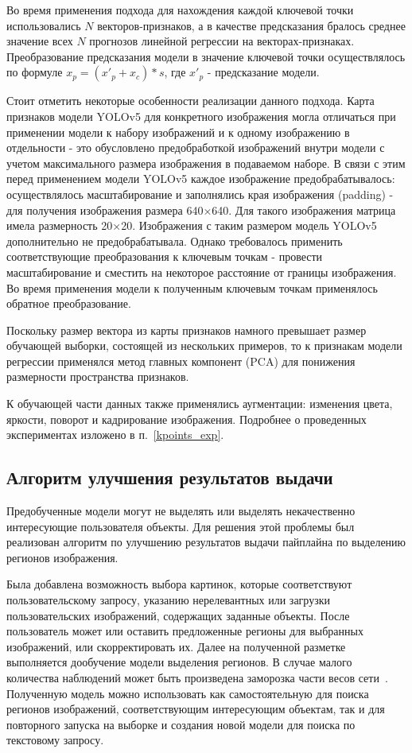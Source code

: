 \documentclass[a4paper,14pt]{article}
\begin{document}
    Во время применения подхода для нахождения каждой ключевой точки использовались $N$ векторов-признаков, а в качестве предсказания бралось среднее значение всех $N$ прогнозов линейной регрессии на векторах-признаках.
    Преобразование предсказания модели в значение ключевой точки осуществлялось по формуле $x_p = (x'_p + x_c) * s$, где $x'_p$ - предсказание модели.

    Стоит отметить некоторые особенности реализации данного подхода.
    Карта признаков модели YOLOv5 для конкретного изображения могла отличаться при применении модели к набору изображений и к одному изображению в отдельности - это обусловлено предобработкой изображений внутри модели с учетом максимального размера изображения в подаваемом наборе.
    В связи с этим перед применением модели YOLOv5 каждое изображение предобрабатывалось: осуществлялось масштабирование и заполнялись края изображения (padding) - для получения изображения размера 640×640.
    Для такого изображения матрица имела размерность 20×20.
    Изображения с таким размером модель YOLOv5 дополнительно не предобрабатывала.
    Однако требовалось применить соответствующие преобразования к ключевым точкам - провести масштабирование и сместить на некоторое расстояние от границы изображения.
    Во время применения модели к полученным ключевым точкам применялось обратное преобразование.

    Поскольку размер вектора из карты признаков намного превышает размер обучающей выборки, состоящей из нескольких примеров, то к признакам модели регрессии применялся метод главных компонент (PCA) для понижения размерности пространства признаков.

    К обучающей части данных также применялись аугментации: изменения цвета, яркости, поворот и кадрирование изображения. Подробнее о проведенных экспериментах изложено в п.~\ref{kpoints_exp}.

    \subsection{Алгоритм улучшения результатов выдачи}

    Предобученные модели могут не выделять или выделять некачественно интересующие пользователя объекты.
    Для решения этой проблемы был реализован алгоритм по улучшению результатов выдачи пайплайна по выделению регионов изображения.

    Была добавлена возможность выбора картинок, которые соответствуют пользовательскому запросу, указанию нерелевантных или загрузки пользовательских изображений, содержащих заданные объекты.
    После пользователь может или оставить предложенные регионы для выбранных изображений, или скорректировать их.
    Далее на полученной разметке выполняется дообучение модели выделения регионов.
    В случае малого количества наблюдений может быть произведена заморозка части весов сети~\cite{wang2020few}.
    Полученную модель можно использовать как самостоятельную для поиска регионов изображений, соответствующим интересующим объектам, так и для повторного запуска на выборке и создания новой модели для поиска по текстовому запросу.
\end{document}
